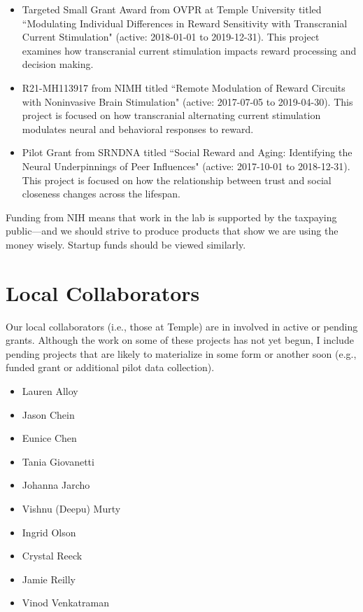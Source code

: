 \documentclass[letterpaper,12pt,oneside]{memoir}
\begin{document}
\begin{itemize}

\item Targeted Small Grant Award from OVPR at Temple University titled ``Modulating Individual Differences in Reward Sensitivity with Transcranial Current Stimulation" (active: 2018-01-01 to 2019-12-31). This project examines how transcranial current stimulation impacts reward processing and decision making.
\item R21-MH113917 from NIMH titled ``Remote Modulation of Reward Circuits with Noninvasive Brain Stimulation" (active: 2017-07-05 to 2019-04-30). This project is focused on how transcranial alternating current stimulation modulates neural and behavioral responses to reward. 
\item Pilot Grant from SRNDNA titled ``Social Reward and Aging: Identifying the Neural Underpinnings of Peer Influences" (active: 2017-10-01 to 2018-12-31). This project is focused on how the relationship between trust and social closeness changes across the lifespan. 

\end{itemize}

Funding from NIH means that work in the lab is supported by the taxpaying public---and we should strive to produce products that show we are using the money wisely. Startup funds should be viewed similarly. 

\section{Local Collaborators}
Our local collaborators (i.e., those at Temple) are in involved in active or pending grants. Although the work on some of these projects has not yet begun, I include pending projects that are likely to materialize in some form or another soon (e.g., funded grant or additional pilot data collection).

\begin{multicols}{2}
\begin{itemize}[noitemsep,nolistsep]
\item Lauren Alloy
\item Jason Chein
\item Eunice Chen
\item Tania Giovanetti
\item Johanna Jarcho
\item Vishnu (Deepu) Murty
\item Ingrid Olson
\item Crystal Reeck
\item Jamie Reilly
\item Vinod Venkatraman
\end{itemize}
\end{multicols}
\end{document}
